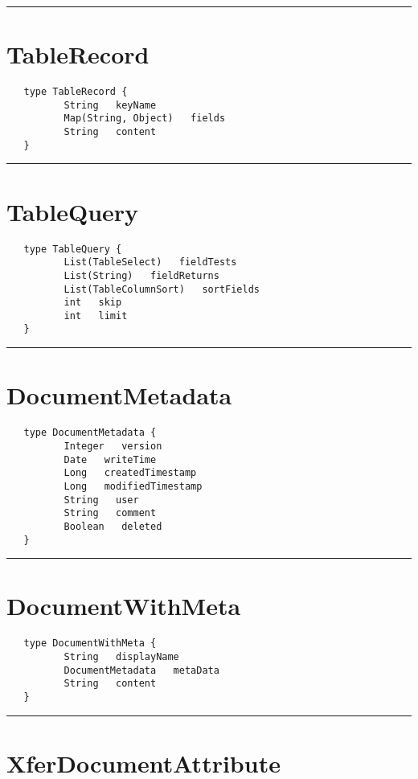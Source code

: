 \rule{12cm}{2pt}
\section{TableRecord}
\label{type:TableRecord}

\begin{verbatim}
   type TableRecord {
          String   keyName
          Map(String, Object)   fields
          String   content
   }
\end{verbatim}

\rule{12cm}{2pt}
\section{TableQuery}
\label{type:TableQuery}

\begin{verbatim}
   type TableQuery {
          List(TableSelect)   fieldTests
          List(String)   fieldReturns
          List(TableColumnSort)   sortFields
          int   skip
          int   limit
   }
\end{verbatim}

\rule{12cm}{2pt}
\section{DocumentMetadata}
\label{type:DocumentMetadata}

\begin{verbatim}
   type DocumentMetadata {
          Integer   version
          Date   writeTime
          Long   createdTimestamp
          Long   modifiedTimestamp
          String   user
          String   comment
          Boolean   deleted
   }
\end{verbatim}

\rule{12cm}{2pt}
\section{DocumentWithMeta}
\label{type:DocumentWithMeta}

\begin{verbatim}
   type DocumentWithMeta {
          String   displayName
          DocumentMetadata   metaData
          String   content
   }
\end{verbatim}

\rule{12cm}{2pt}
\section{XferDocumentAttribute}
\label{type:XferDocumentAttribute}

